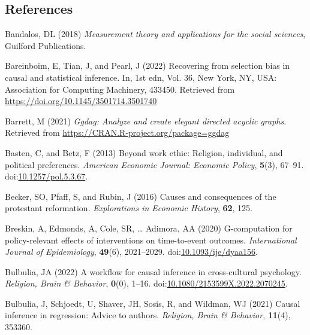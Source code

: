 \documentclass[
  singlecolumn]{article}
\newlength{\cslhangindent}
\newlength{\cslentryspacingunit} %
\newenvironment{CSLReferences}[2] %
 {%
  \setlength{\parindent}{0pt}
  \ifodd #1
  \let\oldpar\par
  \def\par{\hangindent=\cslhangindent\oldpar}
  \fi
  \setlength{\parskip}{#2\cslentryspacingunit}
 }%
 {}
\begin{document}
\hypertarget{references}{%
\subsection{References}\label{references}}

\hypertarget{refs}{}
\begin{CSLReferences}{1}{0}
\leavevmode{}%
Bandalos, DL (2018) \emph{Measurement theory and applications for the
social sciences}, Guilford Publications.

\leavevmode{}%
Bareinboim, E, Tian, J, and Pearl, J (2022) Recovering from selection
bias in causal and statistical inference. In, 1st edn, Vol. 36, New
York, NY, USA: Association for Computing Machinery, 433450. Retrieved
from \url{https://doi.org/10.1145/3501714.3501740}

\leavevmode{}%
Barrett, M (2021) \emph{Ggdag: Analyze and create elegant directed
acyclic graphs}. Retrieved from
\url{https://CRAN.R-project.org/package=ggdag}

\leavevmode{}%
Basten, C, and Betz, F (2013) Beyond work ethic: Religion, individual,
and political preferences. \emph{American Economic Journal: Economic
Policy}, \textbf{5}(3), 67--91.
doi:\href{https://doi.org/10.1257/pol.5.3.67}{10.1257/pol.5.3.67}.

\leavevmode{}%
Becker, SO, Pfaff, S, and Rubin, J (2016) Causes and consequences of the
protestant reformation. \emph{Explorations in Economic History},
\textbf{62}, 125.

\leavevmode{}%
Breskin, A, Edmonds, A, Cole, SR, \ldots{} Adimora, AA (2020)
G-computation for policy-relevant effects of interventions on
time-to-event outcomes. \emph{International Journal of Epidemiology},
\textbf{49}(6), 2021--2029.
doi:\href{https://doi.org/10.1093/ije/dyaa156}{10.1093/ije/dyaa156}.

\leavevmode{}%
Bulbulia, JA (2022) A workflow for causal inference in cross-cultural
psychology. \emph{Religion, Brain \& Behavior}, \textbf{0}(0), 1--16.
doi:\href{https://doi.org/10.1080/2153599X.2022.2070245}{10.1080/2153599X.2022.2070245}.

\leavevmode{}%
Bulbulia, J, Schjoedt, U, Shaver, JH, Sosis, R, and Wildman, WJ (2021)
Causal inference in regression: Advice to authors. \emph{Religion, Brain
\& Behavior}, \textbf{11}(4), 353360.


\end{CSLReferences}
\end{document}
